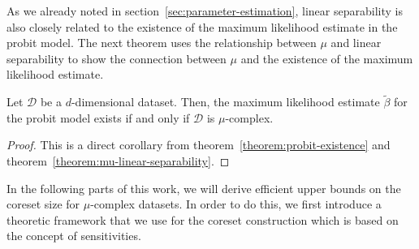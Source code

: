As we already noted in section~\ref{sec:parameter-estimation},
linear separability is also closely related to the existence
of the maximum likelihood estimate in the probit model.
The next theorem uses the relationship between $\mu$ and
linear separability to show the connection between $\mu$
and the existence of the maximum likelihood estimate.

\begin{theorem}
    Let $\mathcal{D}$ be a $d$-dimensional dataset.
    Then, the maximum likelihood estimate $\tilde\beta$ for the probit
    model exists if and only if $\mathcal{D}$ is $\mu$-complex.
\end{theorem}
\begin{proof}
    This is a direct corollary from theorem~\ref{theorem:probit-existence}
    and theorem~\ref{theorem:mu-linear-separability}.
\end{proof}

In the following parts of this work, we will derive efficient upper
bounds on the coreset size for $\mu$-complex datasets.
In order to do this, we first introduce a theoretic
framework that we use for the coreset construction which
is based on the concept of sensitivities.